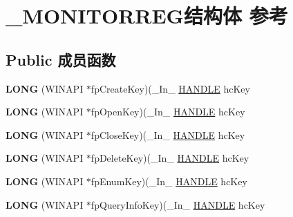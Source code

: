 \hypertarget{struct___m_o_n_i_t_o_r_r_e_g}{}\section{\+\_\+\+M\+O\+N\+I\+T\+O\+R\+R\+E\+G结构体 参考}
\label{struct___m_o_n_i_t_o_r_r_e_g}
\subsection*{Public 成员函数}
\begin{DoxyCompactItemize}
\item 
\mbox{\label{struct___m_o_n_i_t_o_r_r_e_g_a3b3a341c98b63a1250742eac49e40c2a}} 
{\bfseries L\+O\+NG} (W\+I\+N\+A\+PI $\ast$fp\+Create\+Key)(\+\_\+\+In\+\_\+ \hyperlink{interfacevoid}{H\+A\+N\+D\+LE} hc\+Key
\item 
\mbox{\label{struct___m_o_n_i_t_o_r_r_e_g_ae8575e0f8deb3580ecc9920cdb1331cb}} 
{\bfseries L\+O\+NG} (W\+I\+N\+A\+PI $\ast$fp\+Open\+Key)(\+\_\+\+In\+\_\+ \hyperlink{interfacevoid}{H\+A\+N\+D\+LE} hc\+Key
\item 
\mbox{\label{struct___m_o_n_i_t_o_r_r_e_g_aab83b82184f8987aff6dff8b8d6ed152}} 
{\bfseries L\+O\+NG} (W\+I\+N\+A\+PI $\ast$fp\+Close\+Key)(\+\_\+\+In\+\_\+ \hyperlink{interfacevoid}{H\+A\+N\+D\+LE} hc\+Key
\item 
\mbox{\label{struct___m_o_n_i_t_o_r_r_e_g_a27d5bf29c546bf92315fca280181210d}} 
{\bfseries L\+O\+NG} (W\+I\+N\+A\+PI $\ast$fp\+Delete\+Key)(\+\_\+\+In\+\_\+ \hyperlink{interfacevoid}{H\+A\+N\+D\+LE} hc\+Key
\item 
\mbox{\label{struct___m_o_n_i_t_o_r_r_e_g_ab899dd0f13969197e21c6148a53e88e7}} 
{\bfseries L\+O\+NG} (W\+I\+N\+A\+PI $\ast$fp\+Enum\+Key)(\+\_\+\+In\+\_\+ \hyperlink{interfacevoid}{H\+A\+N\+D\+LE} hc\+Key
\item 
\mbox{\label{struct___m_o_n_i_t_o_r_r_e_g_ae676ee7d1870b2fb9f8f2919e3fe54e2}} 
{\bfseries L\+O\+NG} (W\+I\+N\+A\+PI $\ast$fp\+Query\+Info\+Key)(\+\_\+\+In\+\_\+ \hyperlink{interfacevoid}{H\+A\+N\+D\+LE} hc\+Key

\end{DoxyCompactItemize}
